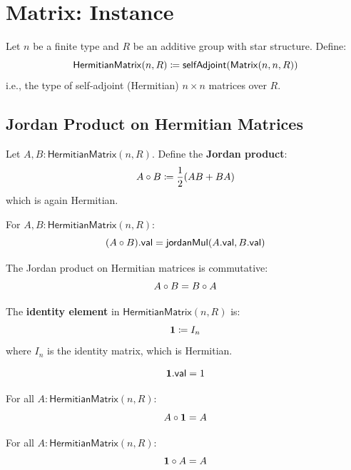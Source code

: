 \section{Matrix: Instance}

\begin{definition}[HermitianMatrix]
Let $n$ be a finite type and $R$ be an additive group with star structure. Define:
\[ \mathsf{HermitianMatrix}(n, R) \coloneqq \mathsf{selfAdjoint}(\mathsf{Matrix}(n, n, R)) \]
i.e., the type of self-adjoint (Hermitian) $n \times n$ matrices over $R$.
\end{definition}

\subsection{Jordan Product on Hermitian Matrices}

\begin{definition}[jmul]
Let $A, B : \mathsf{HermitianMatrix}(n, R)$. Define the \textbf{Jordan product}:
\[ A \circ B \coloneqq \frac{1}{2}(AB + BA) \]
which is again Hermitian.
\end{definition}

\begin{lemma}
For $A, B : \mathsf{HermitianMatrix}(n, R)$:
\[ (A \circ B).\mathsf{val} = \mathsf{jordanMul}(A.\mathsf{val}, B.\mathsf{val}) \]
\end{lemma}

\begin{theorem}
The Jordan product on Hermitian matrices is commutative:
\[ A \circ B = B \circ A \]
\end{theorem}

\begin{definition}[one]
The \textbf{identity element} in $\mathsf{HermitianMatrix}(n, R)$ is:
\[ \mathbf{1} \coloneqq I_n \]
where $I_n$ is the identity matrix, which is Hermitian.
\end{definition}

\begin{lemma}
\[ \mathbf{1}.\mathsf{val} = 1 \]
\end{lemma}

\begin{theorem}
For all $A : \mathsf{HermitianMatrix}(n, R)$:
\[ A \circ \mathbf{1} = A \]
\end{theorem}

\begin{theorem}
For all $A : \mathsf{HermitianMatrix}(n, R)$:
\[ \mathbf{1} \circ A = A \]
\end{theorem}

